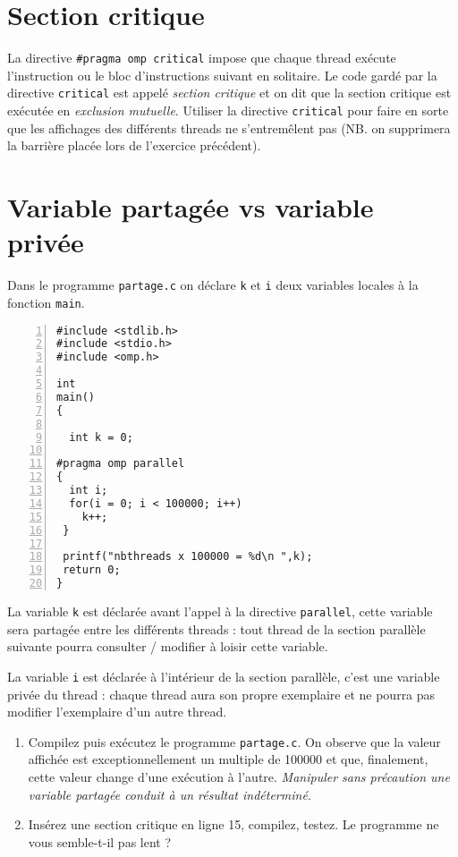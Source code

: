\documentclass[A4wide]{article}
\begin{document}
\section{Section critique}
 La directive \verb&#pragma omp critical& impose que chaque
  thread exécute l'instruction ou le bloc d'instructions suivant en
  solitaire. Le code gardé par la directive \verb#critical# est appelé
  \emph{section critique} et on dit que la section critique est
  exécutée en \emph{exclusion mutuelle}. Utiliser la directive
  \verb#critical# pour faire en sorte que les affichages des
  différents threads ne s'entremêlent pas (NB. on supprimera la barrière
  placée lors de l'exercice précédent).

\newpage
\section{Variable partagée vs variable privée}

Dans le programme \verb&partage.c&  on déclare \verb#k# et
\verb#i# deux variables locales à la fonction \verb#main#. 

\begin{lstlisting}[numbers=left, numberstyle=\tiny, stepnumber=1,  numbersep=5pt]
#include <stdlib.h>
#include <stdio.h>
#include <omp.h>

int 
main() 
{
  
  int k = 0;

#pragma omp parallel 
{
  int i;
  for(i = 0; i < 100000; i++) 
    k++;
 }
 
 printf("nbthreads x 100000 = %d\n ",k); 
 return 0;
}
\end{lstlisting}


La variable \verb&k& est déclarée avant l'appel à la directive
\verb&parallel&, cette variable sera partagée entre les différents
threads : tout thread de la section parallèle suivante pourra
consulter / modifier à loisir cette variable.

La variable \verb&i& est déclarée à l'intérieur de la section
parallèle, c'est une variable privée du thread :
chaque thread aura son propre exemplaire et ne pourra pas modifier
l'exemplaire d'un autre thread.

\begin{enumerate}
\item Compilez puis exécutez le programme \verb&partage.c&. On observe
  que la valeur affichée est exceptionnellement un multiple de 100000 et que,
  finalement, cette valeur change d'une exécution à l'autre.
  \emph{Manipuler sans précaution une variable partagée conduit à un
    résultat indéterminé.}

\item Insérez une section critique en ligne 15, compilez, testez. Le
  programme ne vous semble-t-il pas lent ?  

\end{enumerate}
\end{document}
